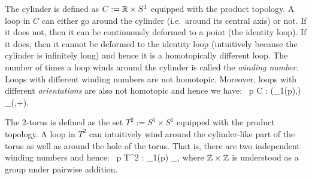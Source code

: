 \be
The cylinder is defined as $C:=\mathbb{R}\times S^1$ equipped with the product topology. A loop in $C$ can either go around the cylinder (i.e.\ around its central axis) or not. If it does not, then it can be continuously deformed to a point (the identity loop). If it does, then it cannot be deformed to the identity loop (intuitively because the cylinder is infinitely long) and hence it is a homotopically different loop. The number of times a loop winds around the cylinder is called the \emph{winding number}. Loops with different winding numbers are not homotopic. Moreover, loops with different \emph{orientations} are also not homotopic and hence we have:
\bse
\forall \, p \in C : (\pi_1(p),\bullet) \cong_(\Z,+).
\ese
\ee

\be
The 2-torus is defined as the set $T^2:=S^1\times S^1$ equipped with the product topology. A loop in $T^2$ can intuitively wind around the cylinder-like part of the torus as well as around the hole of the torus. That is, there are two independent winding numbers and hence:
\bse
\forall \, p \in T^2 : \pi_1(p) \cong_\Z\times \Z,
\ese
where $\mathbb{Z}\times \mathbb{Z}$ is understood as a group under pairwise addition.
\ee







































